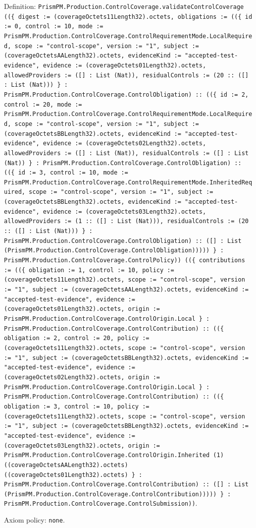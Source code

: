\documentclass[11pt]{article}
\begin{document}
\noindent Definition: \texttt{PrismPM.Production.ControlCoverage.validateControlCoverage ((\{ digest := (coverageOctets11Length32).octets, obligations := ((\{ id := 0, control := 10, mode := PrismPM.Production.ControlCoverage.ControlRequirementMode.LocalRequired, scope := "control-scope", version := "1", subject := (coverageOctetsAALength32).octets, evidenceKind := "accepted-test-evidence", evidence := (coverageOctets01Length32).octets, allowedProviders := ([] : List (Nat)), residualControls := (20 :: ([] : List (Nat))) \} : PrismPM.Production.ControlCoverage.ControlObligation) :: ((\{ id := 2, control := 20, mode := PrismPM.Production.ControlCoverage.ControlRequirementMode.LocalRequired, scope := "control-scope", version := "1", subject := (coverageOctetsBBLength32).octets, evidenceKind := "accepted-test-evidence", evidence := (coverageOctets02Length32).octets, allowedProviders := ([] : List (Nat)), residualControls := ([] : List (Nat)) \} : PrismPM.Production.ControlCoverage.ControlObligation) :: ((\{ id := 3, control := 10, mode := PrismPM.Production.ControlCoverage.ControlRequirementMode.InheritedRequired, scope := "control-scope", version := "1", subject := (coverageOctetsBBLength32).octets, evidenceKind := "accepted-test-evidence", evidence := (coverageOctets03Length32).octets, allowedProviders := (1 :: ([] : List (Nat))), residualControls := (20 :: ([] : List (Nat))) \} : PrismPM.Production.ControlCoverage.ControlObligation) :: ([] : List (PrismPM.Production.ControlCoverage.ControlObligation))))) \} : PrismPM.Production.ControlCoverage.ControlPolicy)) ((\{ contributions := ((\{ obligation := 1, control := 10, policy := (coverageOctets11Length32).octets, scope := "control-scope", version := "1", subject := (coverageOctetsAALength32).octets, evidenceKind := "accepted-test-evidence", evidence := (coverageOctets01Length32).octets, origin := PrismPM.Production.ControlCoverage.ControlOrigin.Local \} : PrismPM.Production.ControlCoverage.ControlContribution) :: ((\{ obligation := 2, control := 20, policy := (coverageOctets11Length32).octets, scope := "control-scope", version := "1", subject := (coverageOctetsBBLength32).octets, evidenceKind := "accepted-test-evidence", evidence := (coverageOctets02Length32).octets, origin := PrismPM.Production.ControlCoverage.ControlOrigin.Local \} : PrismPM.Production.ControlCoverage.ControlContribution) :: ((\{ obligation := 3, control := 10, policy := (coverageOctets11Length32).octets, scope := "control-scope", version := "1", subject := (coverageOctetsBBLength32).octets, evidenceKind := "accepted-test-evidence", evidence := (coverageOctets03Length32).octets, origin := PrismPM.Production.ControlCoverage.ControlOrigin.Inherited (1) ((coverageOctetsAALength32).octets) ((coverageOctets01Length32).octets) \} : PrismPM.Production.ControlCoverage.ControlContribution) :: ([] : List (PrismPM.Production.ControlCoverage.ControlContribution))))) \} : PrismPM.Production.ControlCoverage.ControlSubmission))}.\par
\noindent Axiom policy: \texttt{none}.\par
\end{document}
